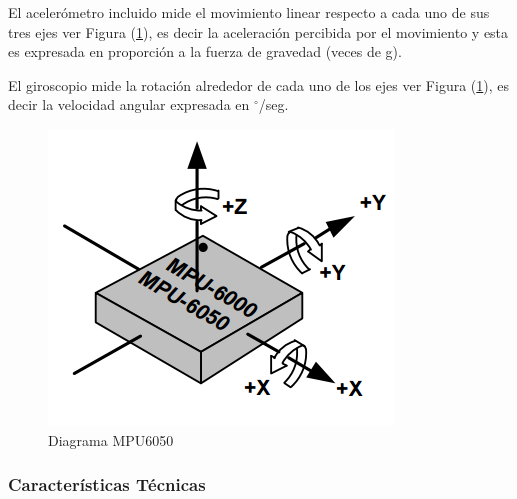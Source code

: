 \documentclass[12pt,a4paper]{article}
\newcommand{\grad}{$^{\circ}$}
\begin{document}
			El acelerómetro incluido mide el movimiento linear respecto a cada uno de sus tres ejes ver Figura (\ref{fig:MPU6050}), es decir la aceleración percibida por el movimiento y esta es expresada en proporción a la fuerza de gravedad (veces de g).
			
			El giroscopio mide la rotación alrededor de cada uno de los ejes ver Figura (\ref{fig:MPU6050}), es decir la velocidad angular expresada en \grad/seg.
			
			\begin{figure}[H]
				\centering
				\includegraphics[scale=0.5]{images/MPU6050}
				\caption{Diagrama MPU6050}
				\label{fig:MPU6050}
			\end{figure}
			
			\subsubsection{Características Técnicas}
			
\end{document}
